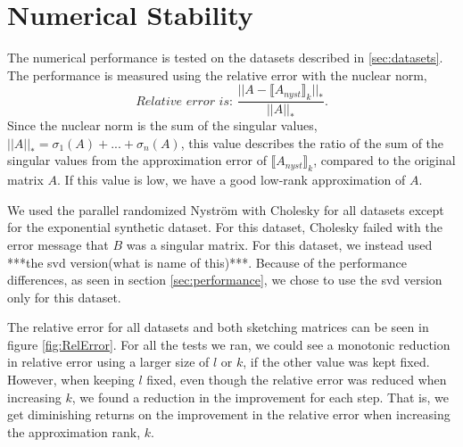 \documentclass{article}
\theoremstyle{definition}
\begin{document}
\section{Numerical Stability} \label{sec:num_stability}

The numerical performance is tested on the datasets described in \ref{sec:datasets}. The performance is measured using the relative error with the nuclear norm,
\begin{equation}
    \textit{Relative error is: } \frac{||A-\llbracket A_{nyst}\rrbracket_k||_*}{||A||_*}.
\end{equation}
Since the nuclear norm is the sum of the singular values, $||A||_*=\sigma_1(A)+...+\sigma_n(A)$, this value describes the ratio of the sum of the singular values from the approximation error of $\llbracket A_{nyst}\rrbracket_k$, compared to the original matrix $A$. If this value is low, we have a good low-rank approximation of $A$. \newline

We used the parallel randomized Nyström with Cholesky for all datasets except for the exponential synthetic dataset. For this dataset, Cholesky failed with the error message that $B$ was a singular matrix. For this dataset, we instead used ***the svd version(what is name of this)***. Because of the performance differences, as seen in section \ref{sec:performance}, we chose to use the svd version only for this dataset.\newline

The relative error for all datasets and both sketching matrices can be seen in figure \ref{fig:RelError}. For all the tests we ran, we could see a monotonic reduction in relative error using a larger size of $l$ or $k$, if the other value was kept fixed. However, when keeping $l$ fixed, even though the relative error was reduced when increasing $k$, we found a reduction in the improvement for each step. That is, we get diminishing returns on the improvement in the relative error when increasing the approximation rank, $k$. \newline
\end{document}
